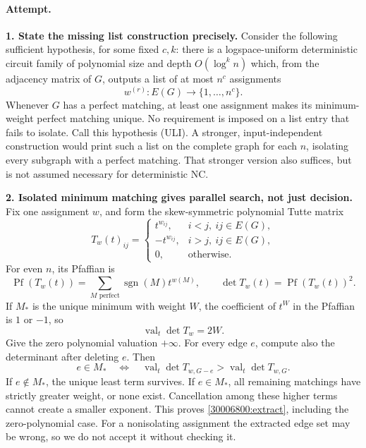 \documentclass[11pt,a4paper]{article}
\numberwithin{equation}{section}
\begin{document}
\paragraph{Attempt.}
\textbf{1. State the missing list construction precisely.}
Consider the following sufficient hypothesis, for some fixed $c,k$:
there is a logspace-uniform deterministic circuit family of polynomial
size and depth $O(\log^k n)$ which, from the adjacency matrix of $G$,
outputs a list of at most $n^c$ assignments
\[
 w^{(r)}:E(G)\longrightarrow\{1,\ldots,n^c\}.
\]
Whenever $G$ has a perfect matching, at least one assignment makes its
minimum-weight perfect matching unique. No requirement is imposed on a
list entry that fails to isolate. Call this hypothesis (ULI).
A stronger, input-independent construction would print such a list on
the complete graph for each $n$, isolating every subgraph with a perfect
matching. That stronger version also suffices, but is not assumed
necessary for deterministic NC.

\textbf{2. Isolated minimum matching gives parallel search, not just decision.}
Fix one assignment $w$, and form the skew-symmetric polynomial Tutte
matrix
\[
 T_w(t)_{ij}=\begin{cases}
 t^{w_{ij}},&i<j,\ ij\in E(G),\\
 -t^{w_{ij}},&i>j,\ ij\in E(G),\\
 0,&\text{otherwise}.
 \end{cases}
\]
For even $n$, its Pfaffian is
\[
 \operatorname{Pf}(T_w(t))=
    \sum_{M\text{ perfect}}\operatorname{sgn}(M)t^{w(M)},
 \qquad \det T_w(t)=\operatorname{Pf}(T_w(t))^2.
\]
If $M_*$ is the unique minimum with weight $W$, the coefficient of
$t^W$ in the Pfaffian is $1$ or $-1$, so
\begin{equation}\label{30006800:valuation}
 \operatorname{val}_t\det T_w=2W.
\end{equation}
Give the zero polynomial valuation $+\infty$. For every edge $e$,
compute also the determinant after deleting $e$. Then
\begin{equation}\label{30006800:extract}
 e\in M_*
 \quad\Longleftrightarrow\quad
 \operatorname{val}_t\det T_{w,G-e}>\operatorname{val}_t\det T_{w,G}.
\end{equation}
If $e\notin M_*$, the unique least term survives. If $e\in M_*$,
all remaining matchings have strictly greater weight, or none exist.
Cancellation among these higher terms cannot create a smaller exponent.
This proves \eqref{30006800:extract}, including the zero-polynomial case.
For a nonisolating assignment the extracted edge set may be wrong, so
we do not accept it without checking it.
\end{document}
